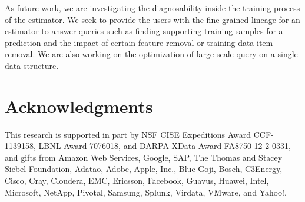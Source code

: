 \documentclass{sig-alternate}
\begin{document}
As future work, we are investigating the diagnosability inside the training process of the estimator. 
We seek to provide the users with the fine-grained lineage for an estimator to answer queries such as
finding supporting training samples for a prediction and the impact of certain feature removal or training data item removal. 
We are also working on the optimization of large scale query on a single data structure.

\section{Acknowledgments}
This research is supported in part by NSF CISE Expeditions Award CCF-1139158, LBNL Award 7076018, and DARPA XData Award FA8750-12-2-0331, and gifts from Amazon Web Services, Google, SAP,  The Thomas and Stacey Siebel Foundation, Adatao, Adobe, Apple, Inc., Blue Goji, Bosch, C3Energy, Cisco, Cray, Cloudera, EMC, Ericsson, Facebook, Guavus, Huawei, Intel, Microsoft, NetApp, Pivotal, Samsung, Splunk, Virdata, VMware, and Yahoo!. 

%

\balance
%
%



\balancecolumns

\end{document}

